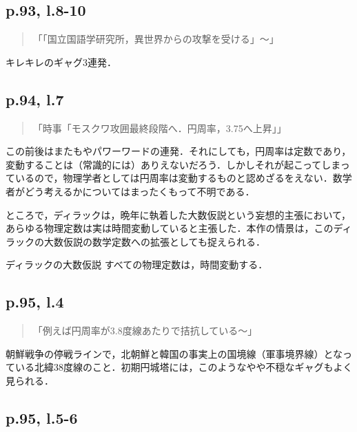 \documentclass[10pt, a5paper, twoside]{ltjsarticle}
\begin{document}
        \subsection{p.93, l.8-10}

            \begin{quote}
                「「国立国語学研究所，異世界からの攻撃を受ける」〜」
            \end{quote}

            キレキレのギャグ3連発．

        \subsection{p.94, l.7}

            \begin{quote}
                「時事「モスクワ攻囲最終段階へ．円周率，3.75へ上昇」」
            \end{quote}

            この前後はまたもやパワーワードの連発．それにしても，円周率は定数であり，変動することは（常識的には）ありえないだろう．しかしそれが起こってしまっているので，物理学者としては円周率は変動するものと認めざるをえない．数学者がどう考えるかについてはまったくもって不明である．

            ところで，ディラックは，晩年に執着した大数仮説という妄想的主張において，あらゆる物理定数は実は時間変動していると主張した．本作の情景は，このディラックの大数仮説の数学定数への拡張としても捉えられる．

            \begin{clm}{ディラックの大数仮説}{}
                すべての物理定数は，時間変動する．
            \end{clm}

        \subsection{p.95, l.4}

            \begin{quote}
                「例えば円周率が3.8度線あたりで拮抗している〜」
            \end{quote}

            朝鮮戦争の停戦ラインで，北朝鮮と韓国の事実上の国境線（軍事境界線）となっている北緯38度線のこと．初期円城塔には，このようなやや不穏なギャグもよく見られる．

        \subsection{p.95, l.5-6}
\end{document}
